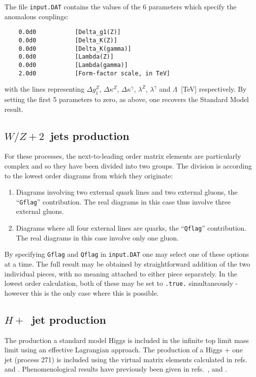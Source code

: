 \documentclass[12pt]{article}
\begin{document}
The file {\tt input.DAT} contains the values of the $6$ parameters
which specify the anomalous couplings:
\begin{verbatim}
    0.0d0           [Delta_g1(Z)]
    0.0d0           [Delta_K(Z)]
    0.0d0           [Delta_K(gamma)]
    0.0d0           [Lambda(Z)]
    0.0d0           [Lambda(gamma)]
    2.0d0           [Form-factor scale, in TeV]
\end{verbatim}
with the lines representing $\Delta g_1^Z$, $\Delta \kappa^Z$,
$\Delta \kappa^\gamma$, $\lambda^Z$, $\lambda^\gamma$ and
$\Lambda$~[TeV] respectively. By setting the first 5 parameters to zero,
as above, one recovers the Standard Model result.

\subsection{$W/Z+2$~jets production}
\label{subsec:v2j}

For these processes, the next-to-leading order matrix elements are
particularly complex and so they have been divided into two groups.
The division is according to the lowest order diagrams from which they
originate:
\begin{enumerate}
\item Diagrams involving two external quark lines and two external gluons,
the ``{\tt Gflag}'' contribution. The real diagrams in this case thus
involve three external gluons.

\item Diagrams where all four external lines are quarks,
the ``{\tt Qflag}'' contribution. The real diagrams in this case 
involve only one gluon.
\end{enumerate}

By specifying {\tt Gflag} and {\tt Qflag} in {\tt input.DAT} one may
select one of these options at a time. The full result may be obtained
by straightforward addition of the two individual pieces, with no
meaning attached to either piece separately. In the lowest order calculation,
both of these may be set to {\tt .true.} simultaneously - however this is
the only case where this is possible.


\subsection{$H +$~jet production}

The production a standard model Higgs is included in the infinite top
limit mass limit using an effective Lagrangian approach. The production of 
a Higgs + one jet (process 271) is included using the virtual matrix elements 
calculated in refs.~\cite{Ravindran:2002dc} and \cite{Schmidt:1997wr}.
Phenomenological results have previously been 
given in refs.~\cite{deFlorian:1999zd},\cite{Ravindran:2002dc} 
and \cite{Glosser:2002gm}.
\end{document}
